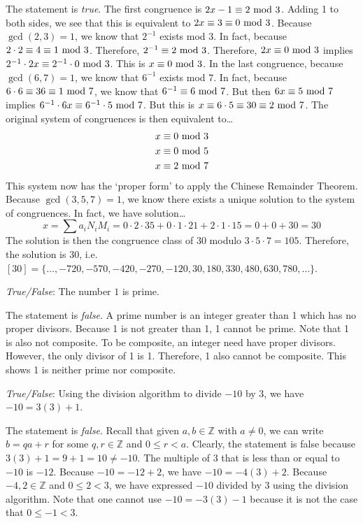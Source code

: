 \documentclass[11pt,letterpaper]{article}
\begin{document}
\sol The statement is \textit{true}. The first congruence is $2x - 1 \equiv 2 \text{ mod } 3$. Adding 1 to both sides, we see that this is equivalent to $2x \equiv 3 \equiv 0 \text{ mod } 3$. Because $\gcd(2, 3)= 1$, we know that $2^{-1}$ exists mod 3. In fact, because $2 \cdot 2 \equiv 4 \equiv 1 \text{ mod } 3$. Therefore, $2^{-1} \equiv 2 \text{ mod } 3$. Therefore, $2x \equiv 0 \text{ mod } 3$ implies $2^{-1} \cdot 2x \equiv 2^{-1} \cdot 0 \text{ mod } 3$. This is $x \equiv 0 \text{ mod } 3$. In the last congruence, because $\gcd(6, 7)= 1$, we know that $6^{-1}$ exists mod 7. In fact, because $6 \cdot 6 \equiv 36 \equiv 1 \text{ mod } 7$, we know that $6^{-1} \equiv 6 \text{ mod } 7$. But then $6x \equiv 5 \text{ mod } 7$ implies $6^{-1} \cdot 6x \equiv 6^{-1} \cdot 5 \text{ mod } 7$. But this is $x \equiv 6 \cdot 5 \equiv 30 \equiv 2 \text{ mod } 7$. The original system of congruences is then equivalent to\dots
	\[
	\begin{aligned}
	x &\equiv 0 \text{ mod } 3 \\
	x &\equiv 0 \text{ mod } 5 \\
	x &\equiv 2 \text{ mod } 7
	\end{aligned}
	\] 
This system now has the `proper form' to apply the Chinese Remainder Theorem. Because $\gcd(3, 5, 7)= 1$, we know there exists a unique solution to the system of congruences. In fact, we have solution\dots
	\[
	x= \sum a_i N_i M_i= 0 \cdot 2 \cdot 35 + 0 \cdot 1 \cdot 21 + 2 \cdot 1 \cdot 15= 0 + 0 + 30= 30 
	\]
The solution is then the congruence class of 30 modulo $3 \cdot 5 \cdot 7= 105$. Therefore, the solution is 30, i.e. $[30]= \{ \ldots, -720, -570, -420, -270, -120, 30, 180, 330, 480, 630, 780, \ldots \}$. \pvspace{1.5cm}



\quizsol \textit{True/False}: The number $1$ is prime. \pspace

\sol The statement is \textit{false}. A prime number is an integer greater than 1 which has no proper divisors. Because 1 is not greater than 1, 1 cannot be prime. Note that 1 is also not composite. To be composite, an integer need have proper divisors. However, the only divisor of 1 is 1. Therefore, 1 also cannot be composite. This shows 1 is neither prime nor composite. \pvspace{1.5cm}



\quizsol \textit{True/False}: Using the division algorithm to divide $-10$ by $3$, we have $-10= 3(3) + 1$. \pspace

\sol The statement is \textit{false}. Recall that given $a, b \in \mathbb{Z}$ with $a \neq 0$, we can write $b= qa + r$ for some $q, r \in \mathbb{Z}$ and $0 \leq r < a$. Clearly, the statement is false because $3(3) + 1= 9 + 1= 10 \neq -10$. The multiple of 3 that is less than or equal to $-10$ is $-12$. Because $-10= -12 + 2$, we have $-10= -4(3) + 2$. Because $-4, 2 \in \mathbb{Z}$ and $0 \leq 2 < 3$, we have expressed $-10$ divided by 3 using the division algorithm. Note that one cannot use $-10= -3(3) - 1$ because it is not the case that $0 \leq -1 < 3$. \pvspace{1.5cm}
\end{document}
